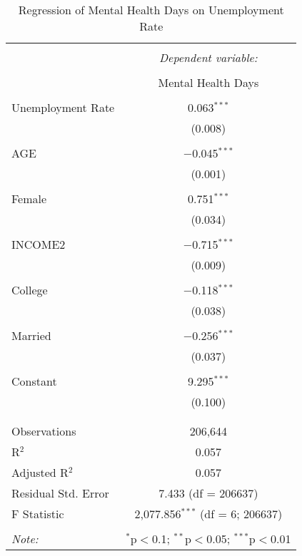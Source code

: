
\begin{table}[H] \centering 
  \caption{Regression of Mental Health Days on Unemployment Rate} 
  \label{} 
\begin{tabular}{@{\extracolsep{5pt}}lc} 
\\[-1.8ex]\hline 
\hline \\[-1.8ex] 
 & \multicolumn{1}{c}{\textit{Dependent variable:}} \\ 
\cline{2-2} 
\\[-1.8ex] & Mental Health Days \\ 
\hline \\[-1.8ex] 
 Unemployment Rate & 0.063$^{***}$ \\ 
  & (0.008) \\ 
  & \\ 
 AGE & $-$0.045$^{***}$ \\ 
  & (0.001) \\ 
  & \\ 
 Female & 0.751$^{***}$ \\ 
  & (0.034) \\ 
  & \\ 
 INCOME2 & $-$0.715$^{***}$ \\ 
  & (0.009) \\ 
  & \\ 
 College & $-$0.118$^{***}$ \\ 
  & (0.038) \\ 
  & \\ 
 Married & $-$0.256$^{***}$ \\ 
  & (0.037) \\ 
  & \\ 
 Constant & 9.295$^{***}$ \\ 
  & (0.100) \\ 
  & \\ 
\hline \\[-1.8ex] 
Observations & 206,644 \\ 
R$^{2}$ & 0.057 \\ 
Adjusted R$^{2}$ & 0.057 \\ 
Residual Std. Error & 7.433 (df = 206637) \\ 
F Statistic & 2,077.856$^{***}$ (df = 6; 206637) \\ 
\hline 
\hline \\[-1.8ex] 
\textit{Note:}  & \multicolumn{1}{r}{$^{*}$p$<$0.1; $^{**}$p$<$0.05; $^{***}$p$<$0.01} \\ 
\end{tabular} 
\end{table} 
